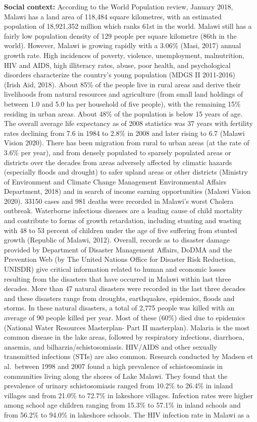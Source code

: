 \documentclass[
]{book}
\begin{document}
\textbf{Social context:} According to the World Population review, January 2018, Malawi has a land area of 118,484 square kilometres, with an estimated population of 18,921,352 million which ranks 61st in the world. Malawi still has a fairly low population density of 129 people per square kilometre (86th in the world). However, Malawi is growing rapidly with a 3.06\% (Masi, 2017) annual growth rate. High incidences of poverty, violence, unemployment, malnutrition, HIV and AIDS, high illiteracy rates, abuse, poor health, and psychological disorders characterize the country's young population (MDGS II 2011-2016) (Irish Aid, 2018). About 85\% of the people live in rural areas and derive their livelihoods from natural resources and agriculture (from small land holdings of between 1.0 and 5.0 ha per household of five people), with the remaining 15\% residing in urban areas. About 48\% of the population is below 15 years of age. The overall average life expectancy as of 2008 statistics was 37 years with fertility rates declining from 7.6 in 1984 to 2.8\% in 2008 and later rising to 6.7 (Malawi Vision 2020). There has been migration from rural to urban areas (at the rate of 3.6\% per year), and from densely populated to sparsely populated areas or districts over the decades from areas adversely affected by climatic hazards (especially floods and drought) to safer upland areas or other districts (Ministry of Environment and Climate Change Management Environmental Affairs Department, 2018) and in search of income earning opportunities (Malawi Vision 2020). 33150 cases and 981 deaths were recorded in Malawi's worst Cholera outbreak. Waterborne infectious diseases are a leading cause of child mortality and contribute to forms of growth retardation, including stunting and wasting with 48 to 53 percent of children under the age of five suffering from stunted growth (Republic of Malawi, 2012). Overall, records as to disaster damage provided by Department of Disaster Management Affairs, DoDMA and the Prevention Web (by The United Nations Office for Disaster Risk Reduction, UNISDR) give critical information related to human and economic losses resulting from the disasters that have occurred in Malawi within last three decades. More than 47 natural disasters were recorded in the last three decades and these disasters range from droughts, earthquakes, epidemics, floods and storms. In these natural disasters, a total of 2,775 people was killed with an average of 90 people killed per year. Most of these (60\%) died due to epidemics (National Water Resources Masterplan- Part II masterplan). Malaria is the most common disease in the lake areas, followed by respiratory infections, diarrhoea, anaemia, and bilharzia/schistosomiasis. HIV/AIDS and other sexually transmitted infections (STIs) are also common. Research conducted by Madsen et al.~between 1998 and 2007 found a high prevalence of schistosomiasis in communities living along the shores of Lake Malawi. They found that the prevalence of urinary schistosomiasis ranged from 10.2\% to 26.4\% in inland villages and from 21.0\% to 72.7\% in lakeshore villages. Infection rates were higher among school age children ranging from 15.3\% to 57.1\% in inland schools and from 56.2\% to 94.0\% in lakeshore schools. The HIV infection rate in Malawi as a 
\end{document}
